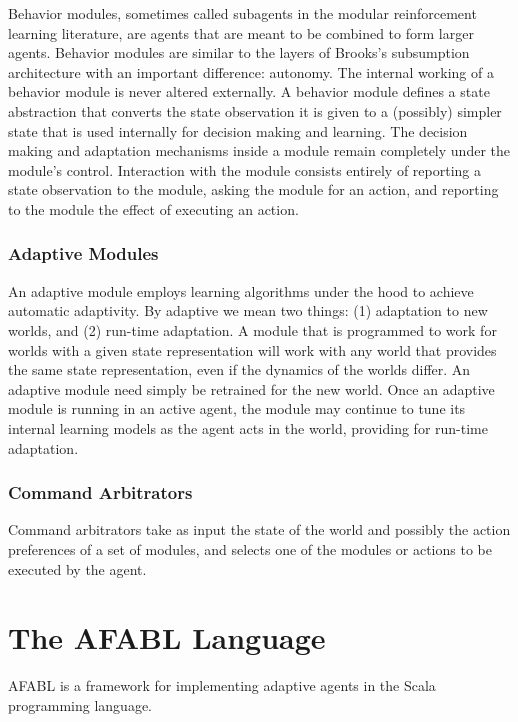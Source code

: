 Behavior modules, sometimes called subagents in the modular reinforcement learning literature, are agents that are meant to be combined to form larger agents.  Behavior modules are similar to the layers of Brooks's subsumption architecture with an important difference: autonomy.  The internal working of a behavior module is never altered externally.  A behavior module defines a state abstraction that converts the state observation it is given to a (possibly) simpler state that is used internally for decision making and learning.  The decision making and adaptation mechanisms inside a module remain completely under the module's control.  Interaction with the module consists entirely of reporting a state observation to the module, asking the module for an action, and reporting to the module the effect of executing an action.

\subsubsection{Adaptive Modules}

An adaptive module employs learning algorithms under the hood to achieve automatic adaptivity.  By adaptive we mean two things: (1) adaptation to new worlds, and (2) run-time adaptation.  A module that is programmed to work for worlds with a given state representation will work with any world that provides the same state representation, even if the dynamics of the worlds differ.  An adaptive module need simply be retrained for the new world.  Once an adaptive module is running in an active agent, the module may continue to tune its internal learning models as the agent acts in the world, providing for run-time adaptation.

\subsubsection{Command Arbitrators}

Command arbitrators take as input the state of the world and possibly the action preferences of a set of modules, and selects one of the modules or actions to be executed by the agent.

\section{The AFABL Language}

AFABL is a framework for implementing adaptive agents in the Scala programming language.

